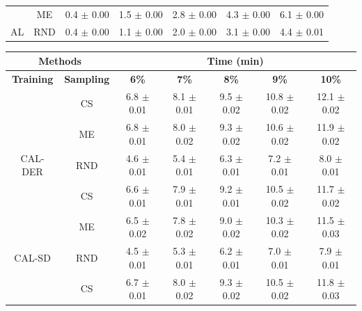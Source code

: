 \begin{table}[htbp]
\begin{tabular*}{\linewidth}{c|c|@{\extracolsep{\fill}}ccccc}
 & ME & 0.4 $\pm$ {\small 0.00} & 1.5 $\pm$ {\small 0.00} & 2.8 $\pm$ {\small 0.00} & 4.3 $\pm$ {\small 0.00} & 6.1 $\pm$ {\small 0.00}\\

\multirow{-3}{*}{\raggedright\arraybackslash AL} & RND & 0.4 $\pm$ {\small 0.00} & 1.1 $\pm$ {\small 0.00} & 2.0 $\pm$ {\small 0.00} & 3.1 $\pm$ {\small 0.00} & 4.4 $\pm$ {\small 0.01}\\
\bottomrule
\end{tabular*}
\vspace{0.5em}

\begin{tabular*}{\linewidth}{c|c|@{\extracolsep{\fill}}ccccc}
\toprule
\multicolumn{2}{c|}{\textbf{Methods}} & \multicolumn{5}{c}{\textbf{Time (min)}} \\
\midrule
\textbf{Training} & \textbf{Sampling} & \textbf{6\%} & \textbf{7\%} & \textbf{8\%} & \textbf{9\%} & \textbf{10\%}\\
\midrule
 & CS & 6.8 $\pm$ {\small 0.01} & 8.1 $\pm$ {\small 0.01} & 9.5 $\pm$ {\small 0.02} & 10.8 $\pm$ {\small 0.02} & 12.1 $\pm$ {\small 0.02}\\

 & ME & 6.8 $\pm$ {\small 0.01} & 8.0 $\pm$ {\small 0.02} & 9.3 $\pm$ {\small 0.02} & 10.6 $\pm$ {\small 0.02} & 11.9 $\pm$ {\small 0.02}\\

\multirow{-3}{*}{\raggedright\arraybackslash CAL-DER} & RND & 4.6 $\pm$ {\small 0.01} & 5.4 $\pm$ {\small 0.01} & 6.3 $\pm$ {\small 0.01} & 7.2 $\pm$ {\small 0.01} & 8.0 $\pm$ {\small 0.01}\\
\midrule
 & CS & 6.6 $\pm$ {\small 0.01} & 7.9 $\pm$ {\small 0.01} & 9.2 $\pm$ {\small 0.01} & 10.5 $\pm$ {\small 0.02} & 11.7 $\pm$ {\small 0.02}\\

 & ME & 6.5 $\pm$ {\small 0.02} & 7.8 $\pm$ {\small 0.02} & 9.0 $\pm$ {\small 0.02} & 10.3 $\pm$ {\small 0.02} & 11.5 $\pm$ {\small 0.03}\\

\multirow{-3}{*}{\raggedright\arraybackslash CAL-SD} & RND & 4.5 $\pm$ {\small 0.01} & 5.3 $\pm$ {\small 0.01} & 6.2 $\pm$ {\small 0.01} & 7.0 $\pm$ {\small 0.01} & 7.9 $\pm$ {\small 0.01}\\
\midrule
 & CS & 6.7 $\pm$ {\small 0.01} & 8.0 $\pm$ {\small 0.02} & 9.3 $\pm$ {\small 0.02} & 10.5 $\pm$ {\small 0.02} & 11.8 $\pm$ {\small 0.03}\\


\end{tabular*}
\end{table}
